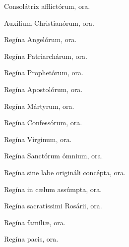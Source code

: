 \noindent Consolátrix afflictórum, \hfill  
 ora.
 
\noindent Auxílium Christianórum,  \hfill
 ora.
 
\noindent Regína Angelórum, \hfill 
 ora.
 
\noindent Regína Patriarchárum, \hfill  
 ora.
 
\noindent Regína Prophetórum, \hfill  
 ora.
 
\noindent Regína Apostolórum, \hfill 
 ora.
 
\noindent Regína Mártyrum, \hfill
 ora.
 
\noindent Regína Confessórum, \hfill
 ora.
 
\noindent Regína Vírginum, \hfill 
 ora.
 
\noindent Regína San\-ctórum ómnium, \hfill   
 ora.
 
\noindent Regína sine labe origináli concé\-pta, \hfill  
 \hfill ora.
 
\noindent Regína in cælum assúm\-pta, \hfill  
 ora.
 
\noindent Regína sacratíssimi Rosárii, \hfill
 ora.
 
\noindent Regína famíliæ, \hfill   
 ora.
 
\noindent Regína pacis, \hfill  
 ora.